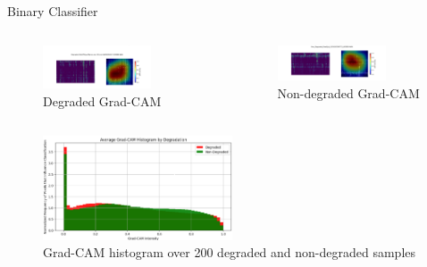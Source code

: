 \begin{frame}{Binary Classifier}
    \begin{columns}
        \begin{column}{0.5\textwidth}
            \begin{figure}
                \centering
                \includegraphics[height=0.75\textheight,width=0.75\textwidth,keepaspectratio]{images/degraded_gradcam.png}
                \caption{Degraded Grad-CAM}
            \end{figure}
        \end{column}
        \begin{column}{0.5\textwidth}
            \begin{figure}
                \centering
                \includegraphics[height=0.75\textheight,width=0.75\textwidth,keepaspectratio]{images/non_degraded_gradcam.png}
                \caption{Non-degraded Grad-CAM}
            \end{figure}
        \end{column}
    \end{columns}
    \begin{figure}
        \centering
        \includegraphics[height=0.5\textheight,width=0.5\textwidth,keepaspectratio]{images/gradcam_histogram.png}
        \caption{Grad-CAM histogram over 200 degraded and non-degraded samples}
    \end{figure}
\end{frame}

